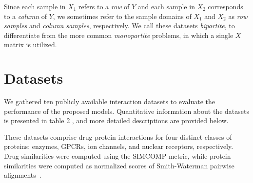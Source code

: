 Since each sample in $X_1$ refers to a \emph{row} of $Y$ and each sample in
$X_2$ corresponds to a \emph{column} of $Y$, we sometimes refer to the sample
domains of $X_1$ and $X_2$ as \emph{row samples} and \emph{column samples},
respectively. We call these datasets \emph{bipartite}, to differentiate from the
more common \emph{monopartite} problems, in which a single $X$ matrix is
utilized.





\section{Datasets}
\label{sec:datasets}

We gathered ten publicly available interaction datasets to evaluate the performance of the proposed models. Quantitative information about the datasets is presented in table 2%
, and more detailed descriptions are provided below.


These datasets comprise drug-protein interactions for four distinct classes of proteins: enzymes, GPCRs, ion channels, and nuclear receptors, respectively. Drug similarities were computed using the SIMCOMP metric, while protein similarities were computed as normalized scores of Smith-Waterman pairwise alignments~\cite{yamanishi2008}.

